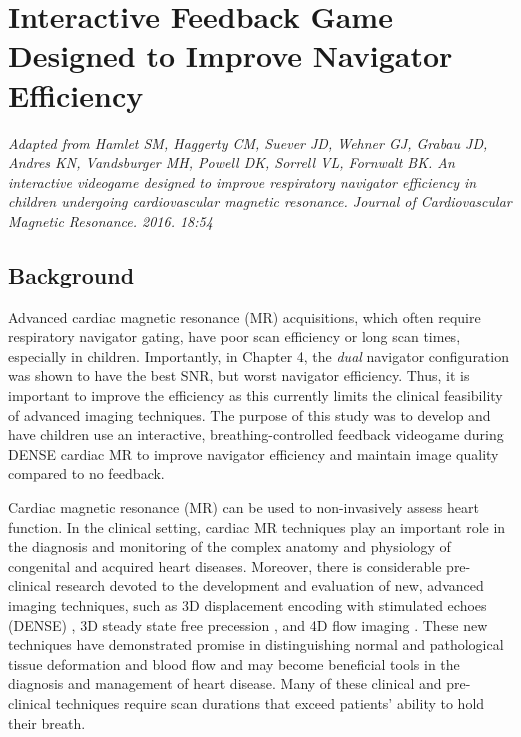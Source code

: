 \chapter{Interactive Feedback Game Designed to Improve Navigator Efficiency}

\begin{center}
	\textit{Adapted from Hamlet SM, Haggerty CM, Suever JD, Wehner GJ, Grabau JD, Andres KN, Vandsburger MH, Powell DK, Sorrell VL, Fornwalt BK. An interactive videogame designed to improve respiratory navigator efficiency in children undergoing cardiovascular magnetic resonance. Journal of Cardiovascular Magnetic Resonance. 2016. 18:54} \cite{Hamlet2016a}
\end{center}
	
\section{Background}
	Advanced cardiac magnetic resonance (MR) acquisitions, which often require respiratory navigator gating, have poor scan efficiency or long scan times, especially in children. Importantly, in Chapter 4, the \textit{dual} navigator configuration was shown to have the best SNR, but worst navigator efficiency. Thus, it is important to improve the efficiency as this currently limits the clinical feasibility of advanced imaging techniques. The purpose of this study was to develop and have children use an interactive, breathing-controlled feedback videogame during DENSE cardiac MR to improve navigator efficiency and maintain image quality compared to no feedback.

	Cardiac magnetic resonance (MR) can be used to non-invasively assess heart function. In the clinical setting, cardiac MR techniques play an important role in the diagnosis and monitoring of the complex anatomy and physiology of congenital and acquired heart diseases. Moreover, there is considerable pre-clinical research devoted to the development and evaluation of new, advanced imaging techniques, such as 3D displacement encoding with stimulated echoes (DENSE) \cite{Zhong2010a}, 3D steady state free precession \cite{Potthast2010}, and 4D flow imaging \cite{Markl2011}. These new techniques have demonstrated promise in distinguishing normal and pathological tissue deformation and blood flow and may become beneficial tools in the diagnosis and management of heart disease. Many of these clinical and pre-clinical techniques require scan durations that exceed patients' ability to hold their breath.
	
